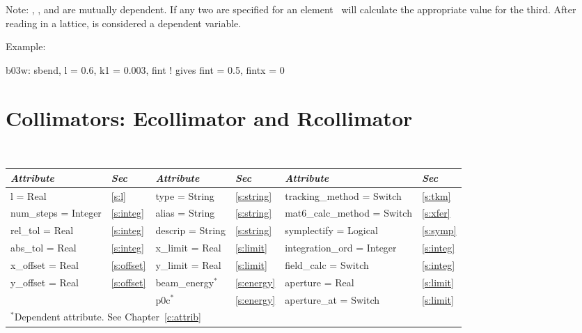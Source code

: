 Note: , , and  are mutually dependent. If any two are
specified for an element \bmad\ will calculate the appropriate value
for the third.  After reading in a lattice,  is considered a
dependent variable.

Example:
\begin{example}
  b03w: sbend, l = 0.6, k1 = 0.003, fint  ! gives fint = 0.5, fintx = 0
\end{example}

\section{Collimators: Ecollimator and Rcollimator}
\label{s:col}

\begin{center}
\tt
\begin{tabular}{|l|l||l|l||l|l|} \hline
  {\sl Attribute} & {\sl Sec}  & {\sl Attribute} & {\sl Sec} & {\sl Attribute} & {\sl Sec} \\ \hline
  l        = Real       & \ref{s:l}      & type = String    & \ref{s:string} & tracking\_method = Switch    & \ref{s:tkm}   \\ \hline
  num\_steps = Integer  & \ref{s:integ}  & alias = String   & \ref{s:string} & mat6\_calc\_method = Switch  & \ref{s:xfer}  \\ \hline
  rel\_tol = Real       & \ref{s:integ}  & descrip = String & \ref{s:string} & symplectify = Logical        & \ref{s:symp}  \\ \hline
  abs\_tol = Real       & \ref{s:integ}  & x\_limit = Real  & \ref{s:limit}  & integration\_ord = Integer   & \ref{s:integ} \\ \hline
  x\_offset  = Real     & \ref{s:offset} & y\_limit = Real  & \ref{s:limit}  & field\_calc = Switch         & \ref{s:integ} \\ \hline
  y\_offset  = Real     & \ref{s:offset} & beam\_energy$^*$ & \ref{s:energy} & aperture = Real              & \ref{s:limit} \\ \hline
                        &                & p0c$^*$          & \ref{s:energy} & aperture\_at = Switch        & \ref{s:limit} \\ \hline
  \multicolumn{6}{l}{\small $^*$Dependent attribute. See Chapter~\ref{c:attrib}} \\
\end{tabular}
\end{center}
\toffset

